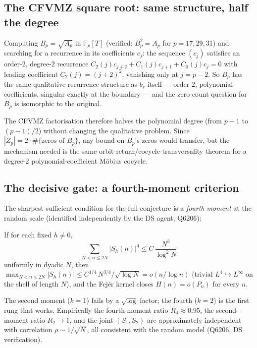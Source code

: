 \subsection{The CFVMZ square root: same structure, half the degree}

Computing $B_p=\sqrt{A_p}$ in $\mathbb F_p[T]$ (verified: $B_p^2=A_p$ for
$p=17,29,31$) and searching for a recurrence in its coefficients $c_j$: the
sequence $(c_j)$ satisfies an order-$2$, degree-$2$ recurrence
$C_2(j)c_{j+2}+C_1(j)c_{j+1}+C_0(j)c_j=0$ with leading coefficient
$C_2(j)=(j+2)^2$, vanishing only at $j=p-2$.  So $B_p$ has the same qualitative
recurrence structure as $b_r$ itself — order $2$, polynomial coefficients, singular exactly at
the boundary — and the zero-count question for $B_p$ is isomorphic to the original.

The CFVMZ factorisation therefore halves the polynomial degree (from $p-1$ to $(p-1)/2$)
without changing the qualitative problem.  Since $|Z_p|=2\cdot\#\{\text{zeros of }B_p\}$, any
bound on $B_p$'s zeros would transfer, but the mechanism needed is the same
orbit-return/cocycle-transversality theorem for a degree-$2$ polynomial-coefficient Möbius
cocycle.

\subsection{The decisive gate: a fourth-moment criterion}
\label{subsec:fourthmoment}

The sharpest sufficient condition for the full conjecture is a \emph{fourth moment} at the
random scale (identified independently by the DS agent, Q6206):

\begin{proposition}
If for each fixed $h\ne0$,
\[
  \sum_{N<n\le2N}|S_h(n)|^4\le C\,\frac{N^3}{\log^2N}
\]
uniformly in dyadic $N$, then
$\max_{N<n\le2N}|S_h(n)|\le C^{1/4}\,N^{3/4}/\!\sqrt{\log N}=o(n/\log n)$
(trivial $L^4\hookrightarrow L^\infty$ on the shell of length $N$), and the Fej\'er kernel
closes $H(n)=o(P_n)$ for every $n$.
\end{proposition}

The second moment ($k=1$) fails by a $\sqrt{\log}$ factor; the fourth ($k=2$) is the first
rung that works.  Empirically the fourth-moment ratio $R_4\approx0.95$, the second-moment ratio
$R_2\to1$, and the joint $(S_1,S_2)$ are approximately independent with correlation
$\rho\sim1/\sqrt{N}$, all consistent with the random model (Q6206, DS verification).

